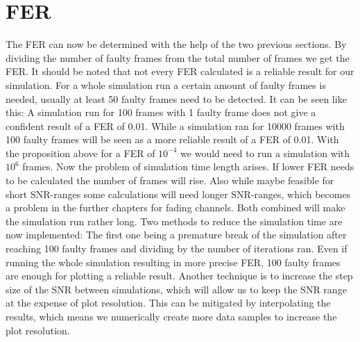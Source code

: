 \section{FER}
The \gls{FER} can now be determined with the help of the two previous sections. By dividing the number of faulty frames from the total number of frames we get the \gls{FER}. It should be noted that not every \gls{FER} calculated is a reliable result for our simulation. For a whole simulation run a certain amount of faulty frames is needed, usually at least 50 faulty frames need to be detected. It can be seen like this: A simulation run for 100 frames with 1 faulty frame does not give a confident result of a \gls{FER} of 0.01. While a simulation ran for 10000 frames with 100 faulty frames will be seen as a more reliable result of a \gls{FER} of 0.01. 
\newline
With the proposition above for a \gls{FER} of $10^{-4}$ we would need to run a simulation with $10^6$ frames. Now the problem of simulation time length arises. If lower \gls{FER} needs to be calculated the number of frames will rise. Also while maybe feasible for short SNR-ranges some calculations will need longer SNR-ranges, which becomes a problem in the further chapters for fading channels. Both combined will make the simulation run rather long.
\newline
Two methods to reduce the simulation time are now implemented: The first one being a premature break of the simulation after reaching 100 faulty frames and dividing by the number of iterations ran. Even if running the whole simulation resulting in more precise \gls{FER}, 100 faulty frames are enough for plotting a reliable result. Another technique is to increase the step size of the SNR between simulations, which will allow us to keep the SNR range at the expense of plot resolution. This can be mitigated by interpolating the results, which means we numerically create more data samples to increase the plot resolution.

\newpage
